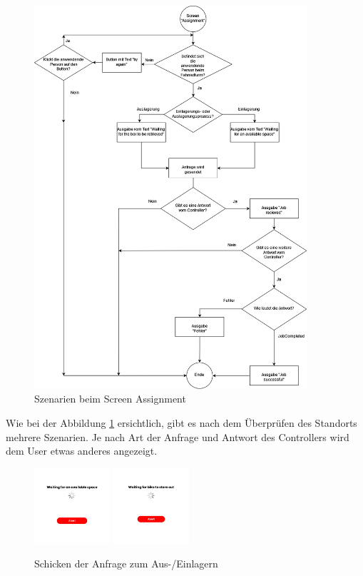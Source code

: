 \begin{figure}[H]
  \centering
  \includegraphics[width=0.9\textwidth]{images/assignmentdiagramm.png}
  \caption{Szenarien beim Screen Assignment}
  \label{fig:assignmentsze}
\end{figure}

\clearpage



Wie bei der Abbildung \ref{fig:assignmentsze} ersichtlich, gibt es nach dem Überprüfen des Standorts mehrere Szenarien. Je nach Art der Anfrage und Antwort des Controllers wird dem User etwas anderes angezeigt.

\begin{figure}[H]
  \centering
  \includegraphics[width=0.25\textwidth]{images/app-screenshots/waitinga.png}
  \includegraphics[width=0.25\textwidth]{images/app-screenshots/waitingb.png}
  \caption{Schicken der Anfrage zum Aus-/Einlagern}
  \label{fig:screenwaiting}
\end{figure}


